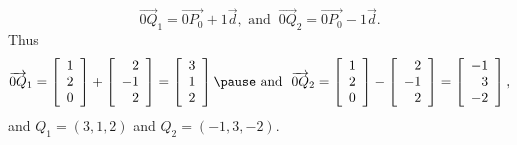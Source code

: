 \documentclass[pdf,handout]{beamer}
\begin{document}
{{\begin{solution}[continued]
\[ \overrightarrow{0Q}_1=\overrightarrow{0P_0} +1\vec{d},
\mbox{ and }~
\overrightarrow{0Q}_2=\overrightarrow{0P_0} -1\vec{d}.\]
\vspace*{-.1in}
\pause
Thus
\[ \overrightarrow{0Q}_1 = 
\left[\begin{array}{r} 1 \\ 2 \\ 0\end{array}\right] +
\left[\begin{array}{r} 2 \\ -1 \\ 2\end{array}\right]
=
\left[\begin{array}{r} 3 \\ 1 \\ 2\end{array}\right]
\pause
\mbox{ and }~
\overrightarrow{0Q}_2 = 
\left[\begin{array}{r} 1 \\ 2 \\ 0\end{array}\right] -
\left[\begin{array}{r} 2 \\ -1 \\ 2\end{array}\right]
=
\left[\begin{array}{r} -1 \\ 3 \\ -2\end{array}\right],
\]
and $Q_1 = (3,1,2)$ and $Q_2=(-1,3,-2)$.
\end{solution}
}

}
\end{document}
